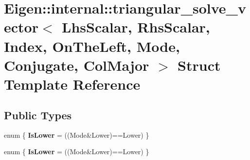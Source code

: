 \hypertarget{struct_eigen_1_1internal_1_1triangular__solve__vector_3_01_lhs_scalar_00_01_rhs_scalar_00_01_ind063e019bb54cf6ae298090bc534a9cdf}{}\section{Eigen\+:\+:internal\+:\+:triangular\+\_\+solve\+\_\+vector$<$ Lhs\+Scalar, Rhs\+Scalar, Index, On\+The\+Left, Mode, Conjugate, Col\+Major $>$ Struct Template Reference}
\label{struct_eigen_1_1internal_1_1triangular__solve__vector_3_01_lhs_scalar_00_01_rhs_scalar_00_01_ind063e019bb54cf6ae298090bc534a9cdf}
\subsection*{Public Types}
\begin{DoxyCompactItemize}
\item 
\mbox{\label{struct_eigen_1_1internal_1_1triangular__solve__vector_3_01_lhs_scalar_00_01_rhs_scalar_00_01_ind063e019bb54cf6ae298090bc534a9cdf_a689219265c65d5d084fd0a69d601a29b}} 
enum \{ {\bfseries Is\+Lower} = ((Mode\&Lower)==Lower)
 \}
\item 
\mbox{\label{struct_eigen_1_1internal_1_1triangular__solve__vector_3_01_lhs_scalar_00_01_rhs_scalar_00_01_ind063e019bb54cf6ae298090bc534a9cdf_a07bbd8a6f13cadfdfe92c2e8f8442fdc}} 
enum \{ {\bfseries Is\+Lower} = ((Mode\&Lower)==Lower)
 \}
\end{DoxyCompactItemize}
